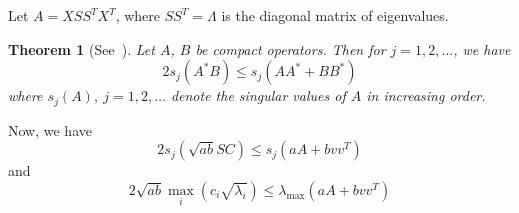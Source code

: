 \documentclass[nobib]{my-handout}
\newtheorem{theorem}{Theorem}
\begin{document}
Let $A = X S S^T X^T$, where $S S^T = \Lambda$ is the diagonal matrix of
eigenvalues.

\begin{theorem}[See~\cite{bhatia_singular_1990}]
	Let $A$, $B$ be compact operators. Then for $j=1,2,\dotsc$, we have
	\begin{equation*}
		2 s_j(A^\ast B) \le s_j(AA^\ast + BB^\ast)
	\end{equation*}
	where $s_j(A),\ j=1,2,\dotsc$ denote the singular values of $A$ in increasing
	order.
\end{theorem}

Now, we have
\begin{equation*}
	2 s_j (\sqrt{ab} S C) \le s_j (a A + b v v^T)
\end{equation*}
and
\begin{equation*}
	2 \sqrt{ab} \max_i(c_i \sqrt{\lambda_i}) \le \lambda_{\max} (a A + b vv^T)
\end{equation*}




\end{document}
